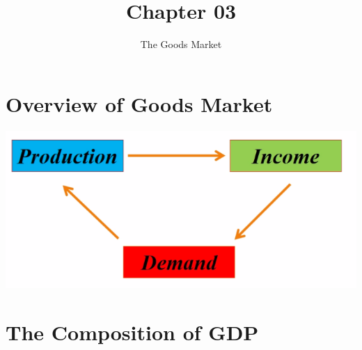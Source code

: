 \documentclass[11pt, a4paper]{ECON2123}
\title{Chapter 03}
\subtitle{The Goods Market}
\begin{document}
\begin{spacing}{1.5}

    \section{Overview of Goods Market}
    \begin{center}
        \includegraphics[scale=0.6]{images/03-overview.png}
    \end{center}
    \section{The Composition of GDP}


\end{spacing}
\end{document}
